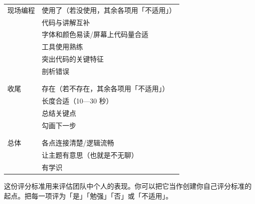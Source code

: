 \begin{longtable}{p{}p{}}
  现场编程
  & 使用了（若没使用，其余各项用「不适用」） \\
  & 代码与讲解互补 \\
  & 字体和颜色易读/屏幕上代码量合适 \\
  & 工具使用熟练 \\
  & 突出代码的关键特征 \\
  & 剖析错误 \\
  \\ [-1.5ex] \hline \\ [-1.5ex]

  收尾
  & 存在（若不存在，其余各项用「不适用」） \\
  & 长度合适（10—30 秒） \\
  & 总结关键点 \\
  & 勾画下一步 \\
  \\ [-1.5ex] \hline \\ [-1.5ex]

  总体
  & 各点连接清楚/逻辑流畅 \\
  & 让主题有意思（也就是不无聊） \\
  & 有学识 \\

\end{longtable}


这份评分标准用来评估团队中个人的表现。你可以把它当作创建你自己评分标准的起点。把每一项评为「是」「勉强」「否」或「不适用」。

